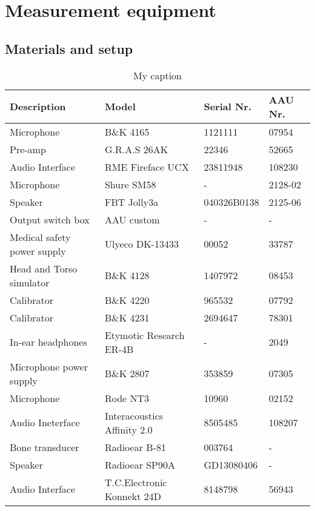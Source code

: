 \chapter{Measurement equipment}\label{appendix:equipment}


\section*{Materials and setup}
\begin{table}[]
\centering
\caption{My caption}
\label{my-label}
\begin{tabular}{l|l|l|l}
Description                 & Model                       & Serial Nr.  & AAU Nr. \\ \hline
Microphone                  & B\&K 4165                   & 1121111     & 07954   \\
Pre-amp                     & G.R.A.S 26AK                & 22346       & 52665   \\
Audio Interface             & RME Fireface UCX            & 23811948    & 108230  \\
Microphone                  & Shure SM58                  & -           & 2128-02 \\
Speaker                     & FBT Jolly3a                 & 040326B0138 & 2125-06 \\
Output switch box           & AAU custom                  & -           & -       \\
Medical safety power supply & Ulyeco DK-13433             & 00052       & 33787   \\
Head and Torso simulator    & B\&K 4128                   & 1407972     & 08453   \\
Calibrator                  & B\&K 4220                   & 965532      & 07792   \\
Calibrator                  & B\&K 4231                   & 2694647     & 78301   \\
In-ear headphones           & Etymotic Research ER-4B     & -           & 2049    \\
Microphone power supply     & B\&K 2807                   & 353859      & 07305   \\
Microphone                  & Rode NT3                    & 10960       & 02152   \\
Audio Ineterface            & Interacoustics Affinity 2.0 & 8505485     & 108207  \\
Bone transducer             & Radioear B-81               & 003764      & -       \\
Speaker                     & Radioear SP90A              & GD13080406  & -       \\
Audio Interface             & T.C.Electronic Konnekt 24D  & 8148798     & 56943  
\end{tabular}
\end{table}

